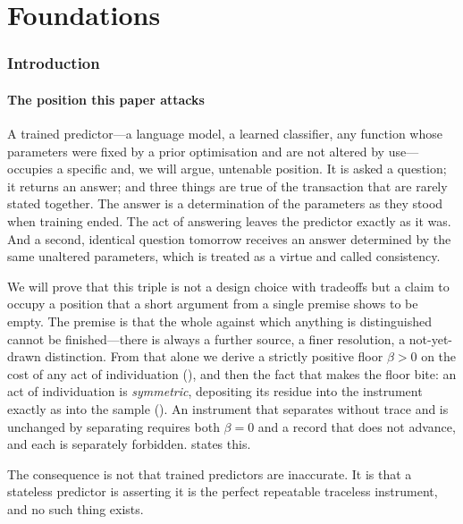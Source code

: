 \documentclass[11pt,twocolumn,a4paper]{article}
\theoremstyle{dirthm}
\theoremstyle{definition}
\theoremstyle{remark}
\newcommand{\flo}{\beta}
\begin{document}
\part{Foundations}

\section{Introduction}
\label{sec:intro}

\subsection{The position this paper attacks}

A trained predictor---a language model, a learned classifier, any function
whose parameters were fixed by a prior optimisation and are not altered by
use---occupies a specific and, we will argue, untenable position. It is asked
a question; it returns an answer; and three things are true of the
transaction that are rarely stated together. The answer is a determination
of the parameters as they stood when training ended. The act of answering
leaves the predictor exactly as it was. And a second, identical question
tomorrow receives an answer determined by the same unaltered parameters,
which is treated as a virtue and called consistency.

We will prove that this triple is not a design choice with tradeoffs but a
claim to occupy a position that a short argument from a single premise shows
to be empty. The premise is that the whole against which anything is
distinguished cannot be finished---there is always a further source, a finer
resolution, a not-yet-drawn distinction. From that alone we derive a strictly
positive floor $\flo>0$ on the cost of any act of individuation
(), and then the fact that makes the floor bite: an act of
individuation is \emph{symmetric}, depositing its residue into the
instrument exactly as into the sample (). An instrument that
separates without trace and is unchanged by separating requires both
$\flo=0$ and a record that does not advance, and each is separately
forbidden.  states this.

The consequence is not that trained predictors are inaccurate. It is that a
stateless predictor is asserting it is the perfect repeatable traceless
instrument, and no such thing exists.
\end{document}
